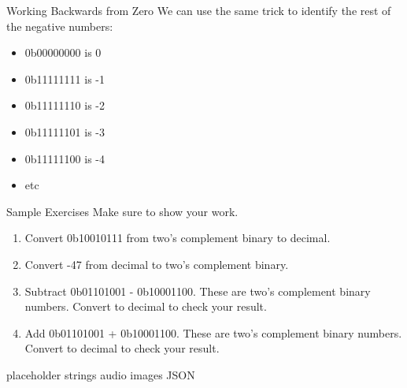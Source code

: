 \begin{frame}{Working Backwards from Zero}
    We can use the same trick to identify the rest of the negative numbers:
        \begin{itemize}
        \item 0b00000000 is 0
        \item 0b11111111 is -1
        \item 0b11111110 is -2
        \item 0b11111101 is -3
        \item 0b11111100 is -4
        \item etc
    \end{itemize}
        \end{frame}

    
\begin{frame}{Sample Exercises}
Make sure to show your work.
\begin{enumerate}
    \item Convert 0b10010111 from two's complement binary to decimal.
    \item Convert -47 from decimal to two's complement binary. 
    \item Subtract 0b01101001 - 0b10001100. These are two's complement binary numbers. Convert to decimal to check your result.
    \item Add 0b01101001 + 0b10001100. These are two's complement binary numbers. Convert to decimal to check your result.
\end{enumerate}
\end{frame}




\begin{frame}{placeholder}
    strings
    audio
    images
    JSON
\end{frame}
    
